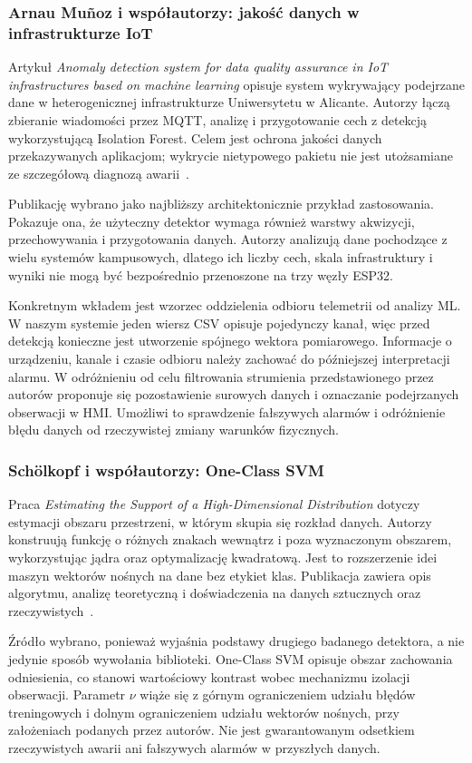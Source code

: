 \documentclass[12pt,a4paper]{article}
\begin{document}
\subsubsection{Arnau Muñoz i współautorzy: jakość danych w infrastrukturze IoT}
Artykuł \emph{Anomaly detection system for data quality assurance in IoT
infrastructures based on machine learning} opisuje system wykrywający
podejrzane dane w heterogenicznej infrastrukturze Uniwersytetu w Alicante.
Autorzy łączą zbieranie wiadomości przez MQTT, analizę i przygotowanie cech
z detekcją wykorzystującą Isolation Forest. Celem jest ochrona jakości
danych przekazywanych aplikacjom; wykrycie nietypowego pakietu nie jest
utożsamiane ze szczegółową diagnozą awarii~\cite{arnau2024}.

Publikację wybrano jako najbliższy architektonicznie przykład zastosowania.
Pokazuje ona, że użyteczny detektor wymaga również warstwy akwizycji,
przechowywania i przygotowania danych. Autorzy analizują dane pochodzące
z wielu systemów kampusowych, dlatego ich liczby cech, skala infrastruktury
i wyniki nie mogą być bezpośrednio przenoszone na trzy węzły ESP32.

Konkretnym wkładem jest wzorzec oddzielenia odbioru telemetrii od analizy ML.
W naszym systemie jeden wiersz CSV opisuje pojedynczy kanał, więc przed
detekcją konieczne jest utworzenie spójnego wektora pomiarowego. Informacje
o urządzeniu, kanale i czasie odbioru należy zachować do późniejszej
interpretacji alarmu. W odróżnieniu od celu filtrowania strumienia przedstawionego
przez autorów proponuje się pozostawienie surowych danych i oznaczanie
podejrzanych obserwacji w HMI. Umożliwi to sprawdzenie fałszywych alarmów
i odróżnienie błędu danych od rzeczywistej zmiany warunków fizycznych.

\subsubsection{Schölkopf i współautorzy: One-Class SVM}
Praca \emph{Estimating the Support of a High-Dimensional Distribution}
dotyczy estymacji obszaru przestrzeni, w którym skupia się rozkład danych.
Autorzy konstruują funkcję o różnych znakach wewnątrz i poza wyznaczonym
obszarem, wykorzystując jądra oraz optymalizację kwadratową. Jest to
rozszerzenie idei maszyn wektorów nośnych na dane bez etykiet klas.
Publikacja zawiera opis algorytmu, analizę teoretyczną i doświadczenia
na danych sztucznych oraz rzeczywistych~\cite{scholkopf2001}.

Źródło wybrano, ponieważ wyjaśnia podstawy drugiego badanego detektora,
a nie jedynie sposób wywołania biblioteki. One-Class SVM opisuje obszar
zachowania odniesienia, co stanowi wartościowy kontrast wobec mechanizmu
izolacji obserwacji. Parametr $\nu$ wiąże się z górnym ograniczeniem udziału
błędów treningowych i dolnym ograniczeniem udziału wektorów nośnych,
przy założeniach podanych przez autorów. Nie jest gwarantowanym odsetkiem
rzeczywistych awarii ani fałszywych alarmów w przyszłych danych.
\end{document}
